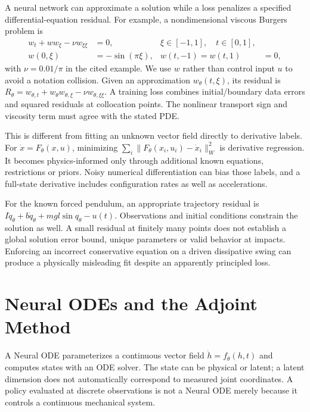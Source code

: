 A neural network can approximate a solution while a loss penalizes a specified differential-equation residual. For example, a nondimensional viscous Burgers problem is
\begin{equation}
\begin{aligned}
w_t+ww_\xi-\nu w_{\xi\xi}&=0,
&\xi\in[-1,1],\quad t\in[0,1],\\
w(0,\xi)&=-\sin(\pi\xi),&
w(t,-1)=w(t,1)&=0,
\end{aligned}
\end{equation}
with $\nu=0.01/\pi$ in the cited example. We use $w$ rather than control input $u$ to avoid a notation collision. Given an approximation $w_\theta(t,\xi)$, its residual is $R_\theta=w_{\theta,t}+w_\theta w_{\theta,\xi}-\nu w_{\theta,\xi\xi}$. A training loss combines initial/boundary data errors and squared residuals at collocation points. The nonlinear transport sign and viscosity term must agree with the stated PDE.

This is different from fitting an unknown vector field directly to derivative labels. For $\dot x=F_\theta(x,u)$, minimizing $\sum_i\|F_\theta(x_i,u_i)-\dot x_i\|_W^2$ is derivative regression. It becomes physics-informed only through additional known equations, restrictions or priors. Noisy numerical differentiation can bias those labels, and a full-state derivative includes configuration rates as well as accelerations.

For the known forced pendulum, an appropriate trajectory residual is $I\ddot q_\theta+b\dot q_\theta+mgl\sin q_\theta-u(t)$. Observations and initial conditions constrain the solution as well. A small residual at finitely many points does not establish a global solution error bound, unique parameters or valid behavior at impacts. Enforcing an incorrect conservative equation on a driven dissipative swing can produce a physically misleading fit despite an apparently principled loss.

\section{Neural ODEs and the Adjoint Method}

A Neural ODE parameterizes a continuous vector field $\dot h=f_\theta(h,t)$ and computes states with an ODE solver. The state can be physical or latent; a latent dimension does not automatically correspond to measured joint coordinates. A policy evaluated at discrete observations is not a Neural ODE merely because it controls a continuous mechanical system.

